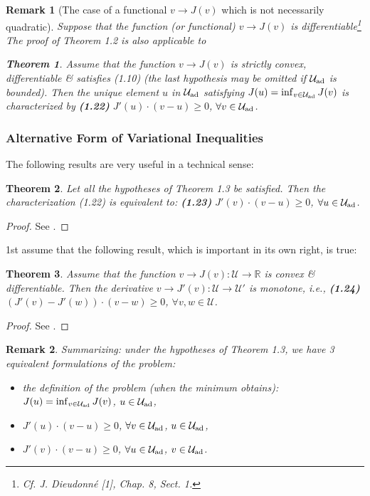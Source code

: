\documentclass[oneside]{book}
\numberwithin{equation}{section}
\newtheorem{remark}{Remark}[chapter]
\newtheorem{theorem}{Theorem}[chapter]
\begin{document}
\begin{remark}[The case of a functional $v\to J(v)$ which is not necessarily quadratic]
	Suppose that the function (or functional) $v\to J(v)$ is differentiable\footnote{Cf. J. Dieudonn\'e [1], Chap. 8, Sect. 1.} The proof of Theorem 1.2 is also applicable to
	
	\begin{theorem}
		Assume that the function $v\to J(v)$ is strictly convex, differentiable \& satisfies (1.10) (the last hypothesis may be omitted if $\mathcal{U}_{\rm ad}$ is bounded). Then the unique element $u$ in $\mathcal{U}_{\rm ad}$ satisfying $J(u) = \inf_{v\in\mathcal{U}_{\rm ad}} J(v)$ is characterized by \textbf{(1.22)} $J'(u)\cdot(v - u)\ge 0$, $\forall v\in\mathcal{U}_{\rm ad}$.
	\end{theorem}
\end{remark}

\subsubsection{Alternative Form of Variational Inequalities}
The following results are very useful in a technical sense:

\begin{theorem}
	Let all the hypotheses of Theorem 1.3 be satisfied. Then the characterization (1.22) is equivalent to: \textbf{(1.23)} $J'(v)\cdot(v - u)\ge 0$, $\forall u\in\mathcal{U}_{\rm ad}$.
\end{theorem}

\begin{proof}
	See \cite[p. 11]{Lions1971}.
\end{proof}
1st assume that the following result, which is important in its own right, is true:

\begin{theorem}
	Assume that the function $v\to J(v):\mathcal{U}\to\mathbb{R}$ is convex \& differentiable. Then the derivative $v\to J'(v):\mathcal{U}\to\mathcal{U}'$ is monotone, i.e., \textbf{(1.24)} $(J'(v) - J'(w))\cdot(v - w)\ge 0$, $\forall v,w\in\mathcal{U}$.
\end{theorem}

\begin{proof}
	See \cite[p. 11]{Lions1971}.
\end{proof}

\begin{remark}
	Summarizing: under the hypotheses of Theorem 1.3, we have \emph{3 equivalent formulations} of the problem:
	\begin{itemize}
		\item[(i)] the definition of the problem (when the minimum obtains): $J(u) = \inf_{v\in\mathcal{U}_{\rm ad}} J(v)$, $u\in\mathcal{U}_{\rm ad}$,
		\item[(ii)] $J'(u)\cdot(v - u)\ge 0$, $\forall v\in\mathcal{U}_{\rm ad}$, $u\in\mathcal{U}_{\rm ad}$,
		\item[(iii)] $J'(v)\cdot(v - u)\ge 0$, $\forall u\in\mathcal{U}_{\rm ad}$, $v\in\mathcal{U}_{\rm ad}$.
	\end{itemize}
\end{remark}
\end{document}
